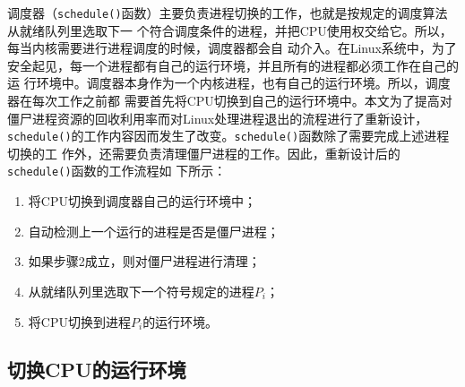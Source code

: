 \documentclass{swfuthesism}
\begin{document}
调度器（\texttt{schedule()}函数）主要负责进程切换的工作，也就是按规定的调度算法从就绪队列里选取下一
个符合调度条件的进程，并把CPU使用权交给它。所以，每当内核需要进行进程调度的时候，调度器都会自
动介入。在Linux系统中，为了安全起见，每一个进程都有自己的运行环境，并且所有的进程都必须工作在自己的运
行环境中。调度器本身作为一个内核进程，也有自己的运行环境。所以，调度器在每次工作之前都
需要首先将CPU切换到自己的运行环境中。本文为了提高对僵尸进程资源的回收利用率而对Linux处理进程退出的流程进行了重新设计，
\texttt{schedule()}的工作内容因而发生了改变。\texttt{schedule()}函数除了需要完成上述进程切换的工
作外，还需要负责清理僵尸进程的工作。因此，重新设计后的\texttt{schedule()}函数的工作流程如
下所示：
\begin{enumerate}
\item 将CPU切换到调度器自己的运行环境中；
\item 自动检测上一个运行的进程是否是僵尸进程；
\item 如果步骤2成立，则对僵尸进程进行清理；
\item 从就绪队列里选取下一个符号规定的进程$P_i$；
\item 将CPU切换到进程$P_i$的运行环境。
\end{enumerate}

\subsection{切换CPU的运行环境}
\end{document}
